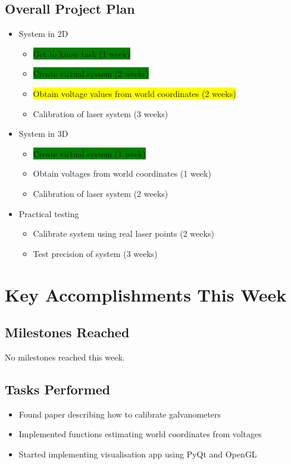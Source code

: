 \documentclass[12pt,notitlepage]{article}
\begin{document}
\subsection{Overall Project Plan}
\begin{itemize}
	\item System in 2D
	\begin{itemize}
		\item \colorbox{green}{Get to know task (1 week)}
		\item \colorbox{green}{Create virtual system (2 weeks)}
		\item \colorbox{yellow}{Obtain voltage values from world coordinates (2 weeks)}
		\item Calibration of laser system (3 weeks)
	\end{itemize}
	\item System in 3D
	\begin{itemize}
		\item \colorbox{green}{Create virtual system (1 week)}
		\item Obtain voltages from world coordinates (1 week)
		\item Calibration of laser system (2 weeks)
	\end{itemize}
	\item Practical testing
	\begin{itemize}
		\item Calibrate system using real laser points (2 weeks)
		\item Test precision of system (3 weeks)
	\end{itemize}
\end{itemize}

\section{Key Accomplishments This Week}
\subsection{Milestones Reached}
No milestones reached this week. 

\subsection{Tasks Performed}
\begin{itemize}
	\item Found paper describing how to calibrate galvanometers
	\item Implemented functions estimating world coordinates from voltages
	\item Started implementing visualisation app using PyQt and OpenGL
\end{itemize}
\end{document}
